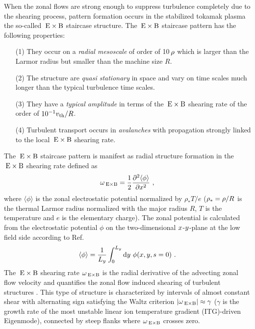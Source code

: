 When the zonal flows are strong enough to suppress turbulence completely due to the shearing process, pattern formation occurs in the stabilized tokamak plasma the so-called $\mathrm{\:E}\times\mathrm{B}$ staircase structure. The $\mathrm{\:E}\times\mathrm{B}$ staircase pattern has the following properties:
\begin{enumerate}
	\item[(1)] They occur on a \textit{radial mesoscale} of order of 10\,$\rho$ which is larger than the Larmor radius but smaller than the machine size $R$.
	\item[(2)] The structure are \textit{quasi stationary} in space and vary on time scales much longer than the typical turbulence time scales.
	\item[(3)] They have a \textit{typical amplitude} in terms of the $\mathrm{\:E}\times\mathrm{B}$ shearing rate of the order of $10^{-1} v_{\mathrm{th}}/R$.
	\item[(4)] Turbulent transport occurs in \textit{avalanches} with propagation strongly linked to the local $\mathrm{\:E}\times\mathrm{B}$ shearing rate. \cite{McMillan2009}
\end{enumerate} \bigskip

The $\mathrm{\:E}\times\mathrm{B}$ staircase pattern is manifest as radial structure formation in the $\mathrm{\:E}\times\mathrm{B}$ shearing rate defined as\cite{Rath2016, Pueschel2008, Peeters2016}
\begin{equation}
	\omega_{\mathrm{\:E \times B}} = \frac{1}{2} \frac{\partial^2 \langle \phi \rangle}{\partial x^2}~,
	\label{eq:shearingrate}
\end{equation}
where $\langle \phi \rangle$ is the zonal electrostatic potential normalized by $\rho_\ast T/e$ ($\rho_\ast = \rho/R$ is the thermal Larmor radius normalized with the major radius $R$, $T$ is the temperature and $e$ is the elementary charge).
The zonal potential is calculated from the electrostatic potential $\phi$ on the two-dimensional $x$-$y$-plane at the low field side according to Ref. 
\begin{equation}
\langle \phi \rangle = \frac{1}{L_y} \int_0^{L_y} \mathrm{d}y ~ \phi(x,y,s=0)~.
\end{equation}
The $\mathrm{\:E}\times\mathrm{B}$ shearing rate $\omega_{\mathrm{\:E \times B}}$ is the radial derivative of the advecting zonal flow velocity \cite{Hahm1995, Waltz1998} and quantifies the zonal flow induced shearing of turbulent structures \cite{Biglari1990, Hahm1995, Burnell1997}. This type of structure is characterized by intervals of almost constant shear with alternating sign satisfying the Waltz criterion $|\omega_{\mathrm{\:E \times B}}| \approx \gamma$\cite{Waltz1994, Waltz1998} ($\gamma$ is the growth rate of the most unstable linear ion temperature gradient (ITG)-driven Eigenmode), connected by steep flanks where $\omega_{\mathrm{\:E \times B}}$ crosses zero. \\ \bigskip

